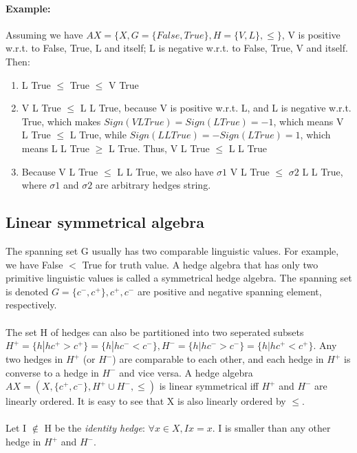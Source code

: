 \documentclass[part1.tex]{subfiles}
\begin{document}
\paragraph{Example:} Assuming we have $AX = \{X, G =
\{False, True\}, H=\{V,L\}, \le\}$, V is positive w.r.t. to
False, True, L and itself; L is negative w.r.t. to
False, True, V and itself. Then:
\begin{enumerate}
        \item L True $\le$ True $\le$ V True
        \item V L True $\le$ L L True, because V is positive
                w.r.t. L, and L is negative w.r.t. True, which
                makes $Sign(V L True) = Sign(L True) = -1$, which
                means V L True $\le$ L True, while $Sign(L L
                True) = -Sign(L True) = 1$, which means L L True
                $\ge$ L True. Thus, V L True $\le$ L L True
        \item Because V L True $\le$ L L True, we also have $\sigma1$ 
                V L True $\le$ $\sigma2$ L L True, where
                $\sigma1$ and $\sigma2$ are arbitrary hedges
                string. 
\end{enumerate}


\subsection{Linear symmetrical algebra}
The spanning set G usually has two comparable linguistic values. For example, we have False \(<\) True
for truth value. A hedge algebra that has only two primitive linguistic values is called a symmetrical
hedge algebra. The spanning set is denoted \(G = \{c^-, c^+\}, c^+, c^-\) are positive and negative 
spanning element, respectively.\\\\

The set H of hedges can also be partitioned into two seperated subsets \(H^+ = \{h|hc^+ > c^+\} = 
\{h|hc^- < c^-\}, H^- = \{h|hc^- > c^-\} = 
\{h|hc^+ < c^+\}\). Any two hedges in \(H^+\) (or \(H^-\)) are comparable to each other, and each hedge in \(H^+\) is converse to a hedge in \(H^-\) and vice versa. A hedge algebra \(AX = (X,\{c^+,c^-\},H^+\cup
H^-, \le)\) is linear symmetrical iff \(H^+\) and \(H^-\) are linearly ordered. It is easy to see
that X is also linearly ordered by \(\le\).\\\\

Let I \(\notin\) H be the {\em identity hedge}: \(\forall x \in X, Ix = x\). I is smaller than any other
hedge in \(H^+\) and \(H^-\).\\\\
\end{document}
